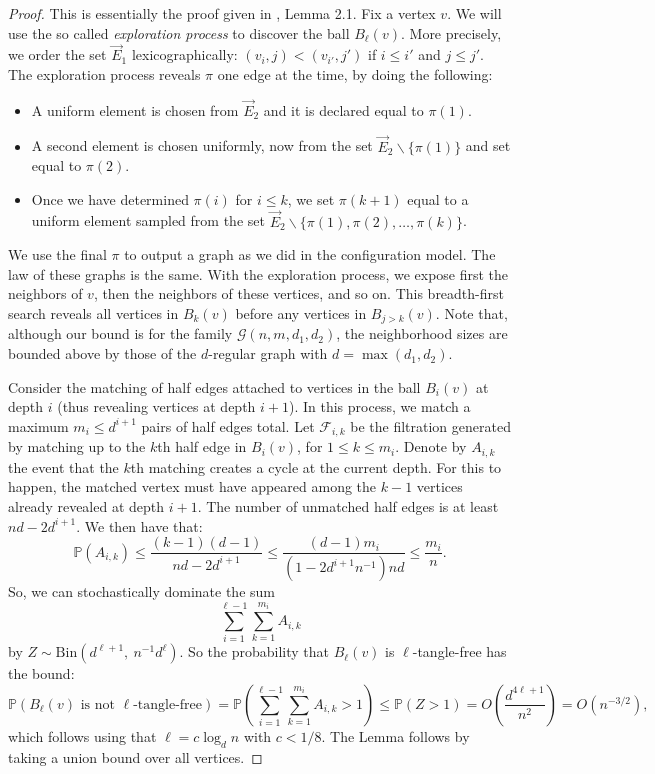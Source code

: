 \begin{proof} 
This is essentially the proof given in \citet*{lubetzky2010}, Lemma 2.1.
Fix a vertex $v$. 
We will use the so called {\it exploration process} to discover the ball $B_{\ell}(v)$. More precisely, we order the set $\vec{E}_1$ lexicographically: 
$(v_i,j) < (v_{i'},j')$ 
if $i\leq i'$ and $j\leq j'$. 
The exploration process reveals $\pi$ one edge at the time, by doing the following:
\begin{itemize}
\item A uniform element is chosen from $\vec{E}_2$ and it is declared equal to $\pi(1)$.
\item A second element is chosen uniformly, now from the set 
$\vec{E}_2\backslash\{\pi(1)\}$ and set equal to $\pi(2)$.
\item Once we have determined $\pi(i)$ for $i\leq k$, we set $\pi(k+1)$ equal to a uniform element sampled from the set $\vec{E}_2\backslash\{\pi(1),\pi(2),\dots,\pi(k)\}$.
\end{itemize}
We use the final $\pi$ to output a graph as we did in the configuration model. 
The law of these graphs is the same.
With the exploration process, we expose first the neighbors of $v$, 
then the neighbors of these vertices, and so on.
This breadth-first search reveals all vertices in $B_k (v)$ before 
any vertices in $B_{j > k} (v)$.
Note that, although our bound is for the family $\mathcal{G}(n,m,d_1,d_2)$,
the neighborhood sizes are bounded above by those of  
the $d$-regular graph with $d=\max(d_1,d_2)$.

Consider the matching of half edges attached to vertices in
the ball $B_i(v)$ at depth $i$
(thus revealing vertices at depth $i+1$).
In this process,
we match a maximum
$m_i \leq d^{i+1}$ pairs of half edges total. 
Let $\mathcal{F}_{i,k}$ be the filtration
generated by matching up to the $k$th half edge
in $B_i(v)$,
for $1 \leq k \leq m_i$. 
Denote by $A_{i,k}$ the event that the $k$th
matching creates a cycle at the current depth.
For this to happen, the matched vertex must have appeared 
among the $k-1$ vertices already revealed at depth $i+1$.
The number of unmatched half edges is at least $nd - 2 d^{i+1}$.
We then have that:
\[
\mathbb{P}(A_{i,k}) 
\leq \frac{(k-1) (d-1)}{nd - 2 d^{i+1}}
\leq \frac{(d-1) m_i}{(1 - 2 d^{i+1} n^{-1}) nd}
\leq \frac{m_i}{n}.
\]
So, we can stochastically dominate the sum
\[
\sum_{i=1}^{\ell-1}\sum_{k=1}^{m_i} A_{i,k}
\]
by $Z \sim \mathrm{Bin} \left( d^{\ell+1},\ n^{-1} d^{\ell} \right)$. 
So the probability that 
$B_{\ell}(v)$ is $\ell$-tangle-free has the bound:
\[
\mathbb{P} (
	\mbox{$B_{\ell}(v)$ is not $\ell$-tangle-free}
 ) =
\mathbb{P} \left(
  \sum_{i=1}^{\ell-1}\sum_{k=1}^{m_i} A_{i,k}> 1
  \right)
  \leq 
\mathbb{P} (Z>1) = 
O\left( \frac{d^{4\ell+1}}{n^2} \right) =
O\left( n^{-3/2} \right) ,
\]
which follows using that $\ell = c \log_d n$ with $c < 1/8$. 
The Lemma follows by taking a union bound over all vertices. 
\end{proof}